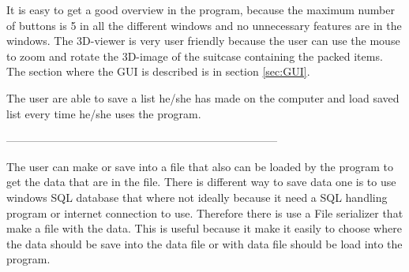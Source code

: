 It is easy to get a good overview in the program, because the maximum number of buttons is 5 in all the different windows and no unnecessary features are in the windows. The 3D-viewer is very user friendly because the user can use the mouse to zoom and rotate the 3D-image of the suitcase containing the packed items. The section where the GUI is described is in section \ref{sec:GUI}.

The user are able to save a list he/she has made on the computer and load saved list every time he/she uses the program.

-------------------------------------------------------------------------- 

The user can make or save into a file that also can be loaded by the program to get the data that are in the file. There is different way to save data one is to use windows SQL database that where not ideally because it need a SQL handling program or internet connection to use. Therefore there is use a File serializer that make a file with the data. This is useful because it make it easily to choose where the data should be save into the data file or with data file should be load into the program.